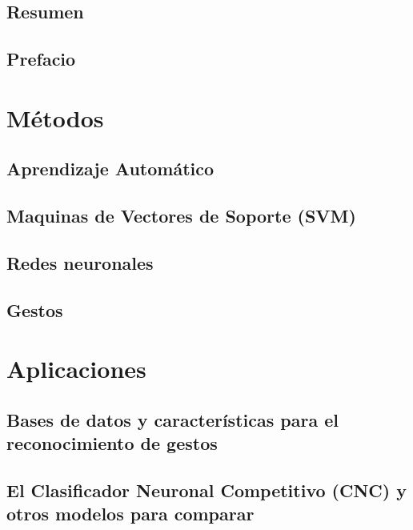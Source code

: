 \documentclass[a4paper,12pt]{book}
\begin{document}
\renewcommand{\chaptername}{}
 

\frontmatter
\tableofcontents

\chapter{Resumen}

\chapter{Prefacio}

\mainmatter 

\part{Métodos}
\label{part:metodos}

\chapter{Aprendizaje Automático }

\chapter{Maquinas de Vectores de Soporte (SVM)}

\chapter{Redes neuronales}

\chapter{Gestos}

\part{Aplicaciones}
\label{part:aplicaciones}

\chapter{Bases de datos y características para el reconocimiento de gestos }

\chapter[El Clasificador Neuronal Competitivo (CNC)]{El Clasificador Neuronal Competitivo (CNC) y otros modelos para comparar}
\end{document}
